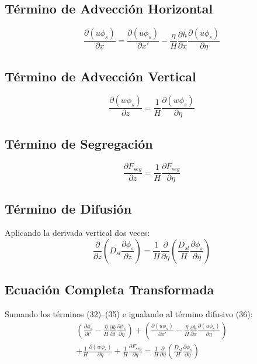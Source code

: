 \documentclass[11pt,a4paper]{article}
\begin{document}
\subsection{Término de Advección Horizontal}
\begin{equation}
    \frac{\partial(u\phi_s)}{\partial x} = \frac{\partial(u\phi_s)}{\partial x'} - \frac{\eta}{H}\frac{\partial h}{\partial x}\frac{\partial(u\phi_s)}{\partial \eta}
\end{equation}

\subsection{Término de Advección Vertical}
\begin{equation}
    \frac{\partial(w\phi_s)}{\partial z} = \frac{1}{H}\frac{\partial(w\phi_s)}{\partial \eta}
\end{equation}

\subsection{Término de Segregación}
\begin{equation}
    \frac{\partial F_{seg}}{\partial z} = \frac{1}{H}\frac{\partial F_{seg}}{\partial \eta}
\end{equation}

\subsection{Término de Difusión}
Aplicando la derivada vertical dos veces:
\begin{equation}
    \frac{\partial}{\partial z}\left(D_{sl}\frac{\partial \phi_s}{\partial z}\right) = \frac{1}{H}\frac{\partial}{\partial \eta}\left(\frac{D_{sl}}{H}\frac{\partial \phi_s}{\partial \eta}\right)
\end{equation}

\subsection{Ecuación Completa Transformada}
Sumando los términos (32)--(35) e igualando al término difusivo (36):
\begin{multline}
    \left(\frac{\partial \phi_s}{\partial t'} - \frac{\eta}{H}\frac{\partial h}{\partial t}\frac{\partial \phi_s}{\partial \eta}\right) + \left(\frac{\partial(u\phi_s)}{\partial x'} - \frac{\eta}{H}\frac{\partial h}{\partial x}\frac{\partial(u\phi_s)}{\partial \eta}\right) \\
    + \frac{1}{H}\frac{\partial(w\phi_s)}{\partial \eta} + \frac{1}{H}\frac{\partial F_{seg}}{\partial \eta} = \frac{1}{H}\frac{\partial}{\partial \eta}\left(\frac{D_{sl}}{H}\frac{\partial \phi_s}{\partial \eta}\right)
\end{multline}
\end{document}
